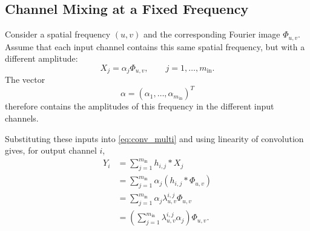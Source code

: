 



\subsection{Channel Mixing at a Fixed Frequency}
\label{subsec:melange_canaux_frequence_fixee}

Consider a spatial frequency $(u,v)$ and the corresponding Fourier image $\Phi_{u,v}$.
Assume that each input channel contains this same spatial frequency, but with a different
amplitude:
\[
    X_j = \alpha_j \Phi_{u,v},
    \qquad j=1,\dots,m_{\mathrm{in}}.
\]
The vector
\[
    \alpha = (\alpha_1,\dots,\alpha_{m_{\mathrm{in}}})^T
\]
therefore contains the amplitudes of this frequency in the different input channels.

Substituting these inputs into \eqref{eq:conv_multi} and using linearity of convolution gives, for output channel $i$,
\begin{align*}
Y_i
&=
\sum_{j=1}^{m_{\mathrm{in}}} h_{i,j} * X_j \\
&=
\sum_{j=1}^{m_{\mathrm{in}}} \alpha_j (h_{i,j} * \Phi_{u,v}) \\
&=
\sum_{j=1}^{m_{\mathrm{in}}} \alpha_j \lambda^{i,j}_{u,v}\Phi_{u,v} \\
&=
\left(
    \sum_{j=1}^{m_{\mathrm{in}}}
    \lambda^{i,j}_{u,v}\alpha_j
\right)
\Phi_{u,v}.
\end{align*}

